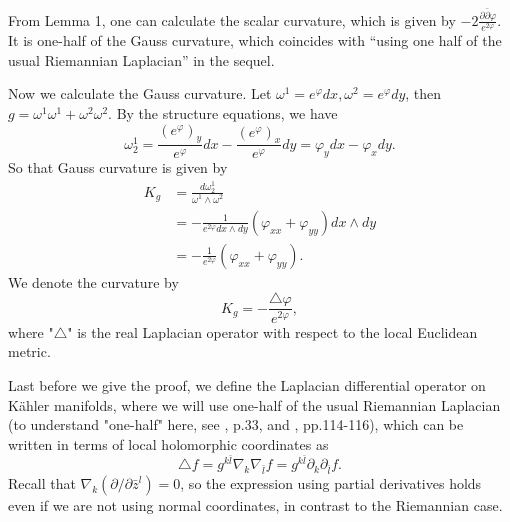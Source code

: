 \documentclass{ctexart}
\begin{document}
From Lemma 1, one can calculate the scalar curvature, which is given by $-2\frac{\partial\bar{\partial}\varphi}{e^{2\varphi}}$. 
It is one-half of the Gauss curvature, which coincides with “using one half of the usual Riemannian Laplacian” in the sequel.  

Now we calculate the Gauss curvature. Let $\omega^1=e^{\varphi} d x, \omega^2=e^{\varphi} d y$, then $g=\omega^1 \omega^1+\omega^2 \omega^2$. 
By the structure equations, we have 
$$
\omega^1_2=\frac{(e^{\varphi})_y}{e^{\varphi}} d x-\frac{(e^{\varphi})_x}{e^{\varphi}} d y= \varphi_y d x-\varphi_x d y.
$$
So that Gauss curvature is given by 
$$
\begin{aligned}
K_g &=\frac{d \omega^1_2}{\omega^1 \wedge \omega^2} \\
&=-\frac{1}{e^{2\varphi} d x \wedge d y}\left(\varphi_{x x}+\varphi_{y y}\right) d x \wedge d y \\
&=-\frac{1}{e^{2\varphi}}\left(\varphi_{x x}+\varphi_{y y}\right).
\end{aligned}
$$
We denote the curvature by
$$
K_g=-\frac{\triangle \varphi}{e^{2 \varphi}},
$$
where "$\triangle$" is the real Laplacian operator with respect to the local Euclidean metric. 

Last before we give the proof, we define the Laplacian differential operator on K\"ahler manifolds, where we will use one-half of 
the usual Riemannian Laplacian (to understand "one-half" here, see \cite{Szekelyhidi2014}, p.33, and \cite{Huybrechts2005}, pp.114-116), which can be written 
in terms of local holomorphic coordinates as
$$
\triangle f=g^{k \bar{l}} \nabla_k \nabla_{\bar{l}} f=g^{k \bar{l}} \partial_k \partial_{\bar{l}} f. 
$$
Recall that $\nabla_k(\partial/\partial\bar{z}^l) = 0$, so the expression using partial derivatives holds even if we are not using normal coordinates, 
in contrast to the Riemannian case.




\end{document}
